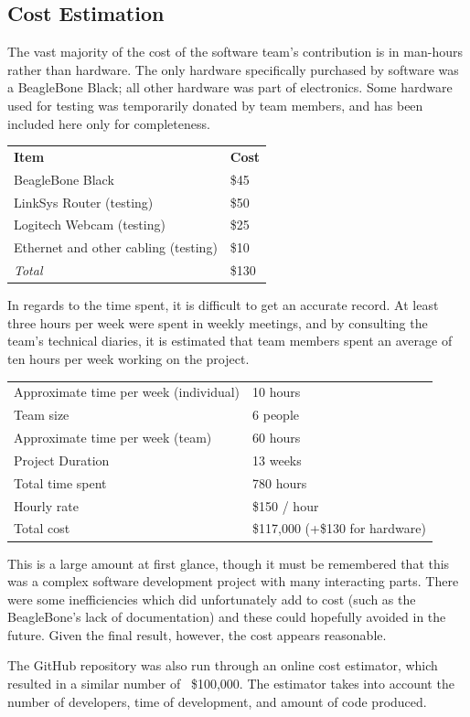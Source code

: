 \subsection{Cost Estimation}

The vast majority of the cost of the software team's contribution is in man-hours rather than hardware. The only hardware specifically purchased by software was a BeagleBone Black; all other hardware was part of electronics. Some hardware used for testing was temporarily donated by team members, and has been included here only for completeness.

\begin{tabular}{l|l}
	{\bf Item} & {\bf Cost} \\
	BeagleBone Black & \$45 \\
	LinkSys Router (testing) & \$50 \\
	Logitech Webcam (testing) & \$25 \\
	Ethernet and other cabling (testing) & \$10 \\
	\emph{Total} & \$130 
\end{tabular}

In regards to the time spent, it is difficult to get an accurate record. At least three hours per week were spent in weekly meetings, and by consulting the team's technical diaries, it is estimated that team members spent an average of ten hours per week working on the project.

\begin{tabular}{l|l}
	Approximate time per week (individual) & 10 hours \\
	Team size & 6 people  \\
	Approximate time per week (team) & 60 hours \\
	Project Duration & 13 weeks \\ 
	Total time spent & 780 hours \\
	Hourly rate & \$150 / hour \\
	Total cost & \$117,000 (+\$130 for hardware)
\end{tabular}

This is a large amount at first glance, though it must be remembered that this was a complex software development project with many interacting parts. There were some inefficiencies which did unfortunately add to cost (such as the BeagleBone's lack of documentation) and these could hopefully avoided in the future. Given the final result, however, the cost appears reasonable.


The GitHub repository was also run through an online cost estimator\cite{ohloh}, which resulted in a similar number of ~\$100,000. The estimator takes into account the number of developers, time of development, and amount of code produced.

